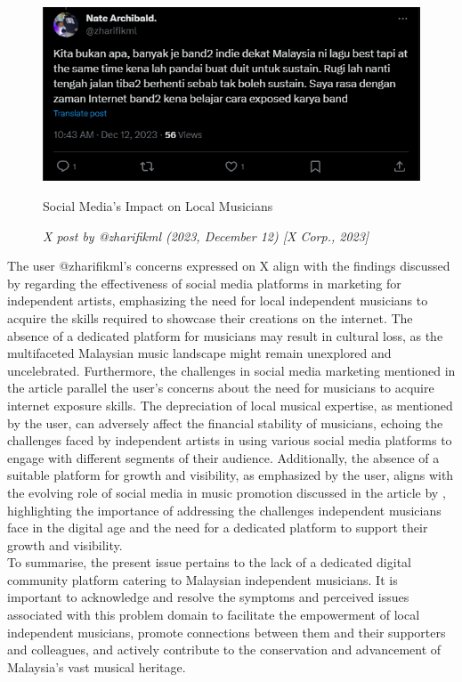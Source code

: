 \begin{figure}[h]
    \centering
    \includegraphics[width=0.8\linewidth]{mainmatter/images/probstate2.png}
    \caption{Social Media's Impact on Local Musicians}
    \caption*{\textit{X post by @zharifikml (2023, December 12) [X Corp., 2023]}}
    \label{fig:myfig2}
\end{figure}
The user @zharifikml's concerns expressed on X align with the findings discussed by \textcite{zanuar22} regarding the effectiveness of social media platforms in marketing for independent artists, emphasizing the need for local independent musicians to acquire the skills required to showcase their creations on the internet. The absence of a dedicated platform for musicians may result in cultural loss, as the multifaceted Malaysian music landscape might remain unexplored and uncelebrated. Furthermore, the challenges in social media marketing mentioned in the article parallel the user's concerns about the need for musicians to acquire internet exposure skills. The depreciation of local musical expertise, as mentioned by the user, can adversely affect the financial stability of musicians, echoing the challenges faced by independent artists in using various social media platforms to engage with different segments of their audience. Additionally, the absence of a suitable platform for growth and visibility, as emphasized by the user, aligns with the evolving role of social media in music promotion discussed in the article by \textcite{jarvekulg21}, highlighting the importance of addressing the challenges independent musicians face in the digital age and the need for a dedicated platform to support their growth and visibility. \\

To summarise, the present issue pertains to the lack of a dedicated digital community platform catering to Malaysian independent musicians. It is important to acknowledge and resolve the symptoms and perceived issues associated with this problem domain to facilitate the empowerment of local independent musicians, promote connections between them and their supporters and colleagues, and actively contribute to the conservation and advancement of Malaysia's vast musical heritage.

